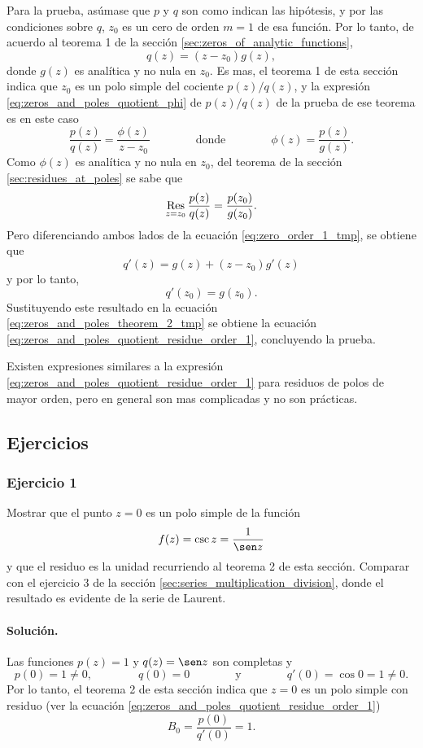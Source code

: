 \documentclass[a4paper]{report}
\def\Res{\qopname\relax m{Res}}
\begin{document}
Para la prueba, asúmase que \(p\) y \(q\) son como indican las hipótesis, y por las condiciones sobre \(q\), \(z_0\) es un cero de orden \(m=1\) de esa función. Por lo tanto, de acuerdo al teorema 1 de la sección \ref{sec:zeros_of_analytic_functions},
\begin{equation}\label{eq:zero_order_1_tmp}
 q(z)=(z-z_0)g(z), 
\end{equation}
donde \(g(z)\) es analítica y no nula en \(z_0\). Es mas, el teorema 1 de esta sección indica que \(z_0\) es un polo simple del cociente \(p(z)/q(z)\), y la expresión \ref{eq:zeros_and_poles_quotient_phi} de \(p(z)/q(z)\) de la prueba de ese teorema es en este caso
\[
 \frac{p(z)}{q(z)}=\frac{\phi(z)}{z-z_0}
 \qquad\qquad\textrm{donde}\qquad\qquad
 \phi(z)=\frac{p(z)}{g(z)}. 
\]
Como \(\phi(z)\) es analítica y no nula en \(z_0\), del teorema de la sección \ref{sec:residues_at_poles} se sabe que 
\begin{equation}\label{eq:zeros_and_poles_theorem_2_tmp}
 \Res_{z=z_0}\frac{p(z)}{q(z)}=\frac{p(z_0)}{g(z_0)}.
\end{equation}
Pero diferenciando ambos lados de la ecuación \ref{eq:zero_order_1_tmp}, se obtiene que 
\[
 q'(z)=g(z)+(z-z_0)g'(z)
\]
y por lo tanto,
\[
 q'(z_0)=g(z_0).
\]
Sustituyendo este resultado en la ecuación \ref{eq:zeros_and_poles_theorem_2_tmp} se obtiene la ecuación \ref{eq:zeros_and_poles_quotient_residue_order_1}, concluyendo la prueba.

Existen expresiones similares a la expresión \ref{eq:zeros_and_poles_quotient_residue_order_1} para residuos de polos de mayor orden, pero en general son mas complicadas y no son prácticas.

\subsection*{Ejercicios}

\subsubsection{Ejercicio 1}

Mostrar que el punto \(z=0\) es un polo simple de la función
\[
 f(z)=\csc z=\frac{1}{\sen z}
\]
y que el residuo es la unidad recurriendo al teorema 2 de esta sección. Comparar con el ejercicio 3 de la sección \ref{sec:series_multiplication_division}, donde el resultado es evidente de la serie de Laurent.

\paragraph{Solución.} Las funciones \(p(z)=1\) y \(q(z)=\sen z\) son completas y 
\[
 p(0)=1\neq0,
 \qquad\qquad 
 q(0)=0
 \qquad\qquad\textrm{y}\qquad\qquad
 q'(0)=\cos0=1\neq0.
\]
Por lo tanto, el teorema 2 de esta sección indica que \(z=0\) es un polo simple con residuo (ver la ecuación \ref{eq:zeros_and_poles_quotient_residue_order_1})
\[
 B_0=\frac{p(0)}{q'(0)}=1.
\]
\end{document}
